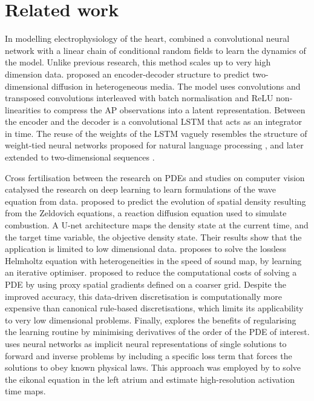 \documentclass[utf8]{frontiersSCNS} %
\begin{document}
\section{Related work}
\label{sec:related_work}
In modelling electrophysiology of the heart, \cite{Herzog2018} combined a convolutional neural network with a linear chain of conditional random fields to learn the dynamics of the \cite{Bueno-Orovio2008MinimalTissue} model.
Unlike previous research, this method scales up to very high dimension data.
\cite{Cantwell2019RethinkingModelling} proposed an encoder-decoder structure to predict two-dimensional diffusion in heterogeneous media. The model uses convolutions and transposed convolutions interleaved with batch normalisation \cite[]{Ioffe2015BatchShift} and ReLU non-linearities to compress the AP observations into a latent representation.
Between the encoder and the decoder is a convolutional LSTM \cite[]{Shi2015ConvolutionalNowcasting, Hochreiter1997LongMemory, Zaremba2014RecurrentRegularization} that acts as an integrator in time.
The reuse of the weights of the LSTM vaguely resembles the structure of weight-tied neural networks proposed for natural language processing \cite[]{Press2017UsingModels, Inan2017TyingModeling}, and later extended to two-dimensional sequences \cite[]{bai2018trellis}.

Cross fertilisation between the research on PDEs and studies on computer vision catalysed the research on deep learning to learn formulations of the wave equation from data.
\cite{Li2020ReactionNetwork} proposed to predict the evolution of spatial density resulting from the Zeldovich equations, a reaction diffusion equation used to simulate combustion. A U-net architecture maps the density state at the current time, and the target time variable, the objective density state. Their results show that the application is limited to low dimensional data.
\cite{Stanziola2020AUltrasound} proposes to solve the lossless Helmholtz equation with heterogeneities in the speed of sound map, by learning an iterative optimiser.
\cite{Bar-Sinai2019LearningEquations} proposed to reduce the computational costs of solving a PDE by using proxy spatial gradients defined on a coarser grid. Despite the improved accuracy, this data-driven discretisation is computationally more expensive than canonical rule-based discretisations, which limits its applicability to very low dimensional problems.
Finally, \cite{Kelly2020LearningSolve} explores the benefits of regularising the learning routine by minimising derivatives of the order of the PDE of interest. \cite{Raissi2019Physics-informedEquations} uses neural networks as implicit neural representations of single solutions to forward and inverse problems by including a specific loss term that forces the solutions to obey known physical laws. This approach was employed by \cite{SahliCostabal2020Physics-InformedMapping} to solve the eikonal equation in the left atrium and estimate high-resolution activation time maps.
\end{document}
